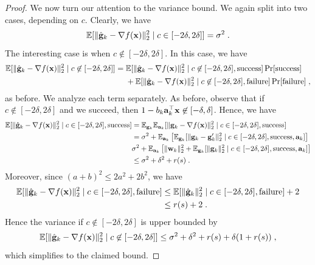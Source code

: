 \documentclass{article}
\def\a{{\bf a}}
\def\g{{\bf g}}
\def\x{{\bf x}}
\def\w{{\bf w}}
\def\E{\mathbb{E}}
\begin{document}
\begin{proof}
We now turn our attention to the variance bound.
We again split into two cases, depending on $c$.
Clearly, we have
\[
\E [\| \hat{\g}_k - \nabla f(\x) \|_2^2 \mid c \in [-2 \delta, 2 \delta]] = \sigma^2 \; .
\]
The interesting case is when $c \not\in [-2 \delta, 2 \delta]$.
In this case, we have
\begin{align*}
\E [\| \hat{\g}_k - \nabla f(\x) \|_2^2 \mid c \not\in [-2 \delta, 2 \delta]] &= \E [\| \hat{\g}_k - \nabla f(\x) \|_2^2 \mid c \not\in [-2 \delta, 2 \delta], \mathrm{success}] \Pr [\mathrm{success}]  \\
 &~~~~ +\E [\| \hat{\g}_k - \nabla f(\x) \|_2^2 \mid c \not\in [-2 \delta, 2 \delta], \mathrm{failure}] \Pr [\mathrm{failure}] \; ,
\end{align*}
as before.
We analyze each term separately.
As before, observe that if $c \not\in [-2 \delta, 2 \delta]$ and we succeed, then $1 - b_k \a_k^\top \x \not\in [- \delta, \delta]$.
Hence, we have
\begin{align*}
\E [\| \hat{\g}_k - \nabla f(\x) \|_2^2 \mid c \in [-2 \delta, 2 \delta], \mathrm{success}] &= \E_{\g_k} \E_{\a_k} [\| \g_k - \nabla f(\x) \|_2^2 \mid c \in [-2 \delta, 2 \delta], \mathrm{success}] \\
&= \sigma^2 + \E_{\a_k} \left[ \E_{\g_k} [\| \g_k - \g'_k \|_2^2 \mid c \in [-2 \delta, 2 \delta], \mathrm{success}, \a_k] \right] \\
&\sigma^2 + \E_{\a_k} \left[ \| \w_k \|_2^2 + \E_{\g_k} [\| \g_k \|_2^2 \mid c \in [-2 \delta, 2 \delta], \mathrm{success}, \a_k] \right] \\
&\leq \sigma^2 + \delta^2 + r(s) \; .
\end{align*}
Moreover, since $(a + b)^2 \leq 2 a^2 + 2 b^2$, we have
\begin{align*}
\E [\| \hat{\g}_k - \nabla f(\x) \|_2^2 \mid c \in [-2 \delta, 2 \delta], \mathrm{failure}] &\leq \E [\| \hat{\g}_k \|_2^2 \mid c \in [-2 \delta, 2 \delta], \mathrm{failure}] + 2 \\
&\leq r(s) + 2 \; .
\end{align*}
Hence the variance if $c \not\in [-2 \delta, 2 \delta]$ is upper bounded by 
\[
\E [\| \hat{\g}_k - \nabla f(\x) \|_2^2 \mid c \not\in [-2 \delta, 2 \delta]] \leq \sigma^2 + \delta^2 + r(s) + \delta (1 + r(s)) \; ,
\]
which simplifies to the claimed bound.

\end{proof}
\end{document}
